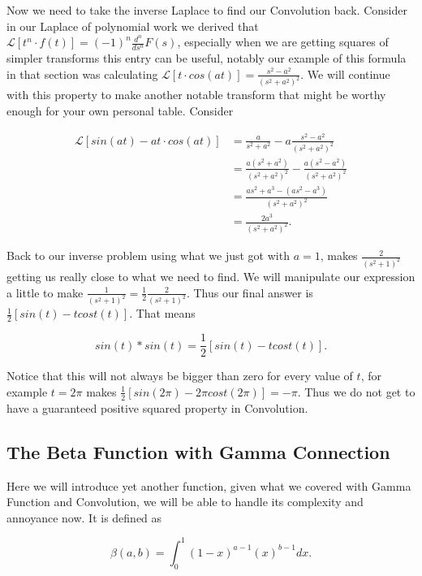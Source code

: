 \documentclass[12pt]{article}
\newcommand{\lp}{\mathscr{L}}
\begin{document}
Now we need to take the inverse Laplace to find our Convolution back. Consider in our Laplace of polynomial work we derived that $\lp[t^n \cdot f(t)]=(-1)^n \frac{d^n}{ds^n}F(s)$, especially when we are getting squares of simpler transforms this entry can be useful, notably our example of this formula in that section was calculating $\lp[t \cdot cos(at)]=\frac{s^2-a^2}{(s^2+a^2)^2}$. We will continue with this property to make another notable transform that might be worthy enough for your own personal table. Consider

\begin{align*}
    \lp[sin(at) - at \cdot cos(at)] &= \frac{a}{s^2+a^2}-a\frac{s^2-a^2}{(s^2+a^2)^2} \\
    &= \frac{a(s^2+a^2)}{(s^2+a^2)^2}-\frac{a(s^2-a^2)}{(s^2+a^2)^2} \\
    &=\frac{as^2+a^3-(as^2-a^3)}{(s^2+a^2)^2} \\
    &=\frac{2a^3}{(s^2+a^2)^2}.
\end{align*}

Back to our inverse problem using what we just got with $a=1$, makes $\frac{2}{(s^2+1)^2}$ getting us really close to what we need to find. We will manipulate our expression a little to make $\frac{1}{(s^2+1)^2}=\frac{1}{2}\frac{2}{(s^2+1)^2}$. Thus our final answer is $\frac{1}{2}[sin(t)-tcost(t)]$. That means

\begin{equation*}
    sin(t) \ast sin(t) = \frac{1}{2}[sin(t)-tcost(t)].
\end{equation*}

Notice that this will not always be bigger than zero for every value of $t$, for example $t=2\pi$ makes $\frac{1}{2}[sin(2\pi)-2\pi cost(2\pi)]=-\pi$. Thus we do not get to have a guaranteed positive squared property in Convolution.

\subsection{The Beta Function with Gamma Connection}

Here we will introduce yet another function, given what we covered with Gamma Function and Convolution, we will be able to handle its complexity and annoyance now. It is defined as

\begin{equation*}
    \beta(a,b) = \int_{0}^{1} (1-x)^{a-1}(x)^{b-1} dx.
\end{equation*}
\end{document}
